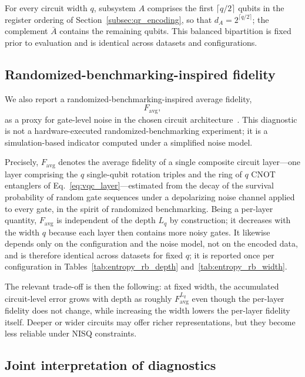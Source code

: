 \documentclass[11pt,a4paper]{article}
\begin{document}
For every circuit width \(q\), subsystem \(A\) comprises the first
\(\lceil q/2\rceil\) qubits in the register ordering of
Section~\ref{subsec:qr_encoding}, so that
\(d_A=2^{\lceil q/2\rceil}\); the complement \(\bar A\) contains the
remaining qubits. This balanced bipartition is fixed prior to evaluation
and is identical across datasets and configurations.

\subsection{Randomized-benchmarking-inspired fidelity}
\label{subsec:rb_fidelity}

We also report a randomized-benchmarking-inspired average fidelity,
\[
    F_{\mathrm{avg}},
\]
as a proxy for gate-level noise in the chosen circuit
architecture~\cite{knill2008randomized,magesan2011scalable,magesan2012characterizing}.
This diagnostic is not a hardware-executed randomized-benchmarking
experiment; it is a simulation-based indicator computed under a simplified
noise model.

Precisely, \(F_{\mathrm{avg}}\) denotes the average fidelity of a single
composite circuit layer---one layer comprising the \(q\) single-qubit
rotation triples and the ring of \(q\) CNOT entanglers of
Eq.~\eqref{eq:vqc_layer}---estimated from the decay of the survival
probability of random gate sequences under a depolarizing noise channel
applied to every gate, in the spirit of randomized benchmarking. Being a
per-layer quantity, \(F_{\mathrm{avg}}\) is independent of the depth
\(L_q\) by construction; it decreases with the width \(q\) because each
layer then contains more noisy gates. It likewise depends only on the
configuration and the noise model, not on the encoded data, and is
therefore identical across datasets for fixed \(q\); it is reported once
per configuration in Tables~\ref{tab:entropy_rb_depth}
and~\ref{tab:entropy_rb_width}.

The relevant trade-off is then the following: at fixed width, the
accumulated circuit-level error grows with depth as roughly
\(F_{\mathrm{avg}}^{L_q}\) even though the per-layer fidelity does not
change, while increasing the width lowers the per-layer fidelity itself.
Deeper or wider circuits may offer richer representations, but they become
less reliable under NISQ constraints.

\subsection{Joint interpretation of diagnostics}
\label{subsec:diagnostic_interpretation}
\end{document}
